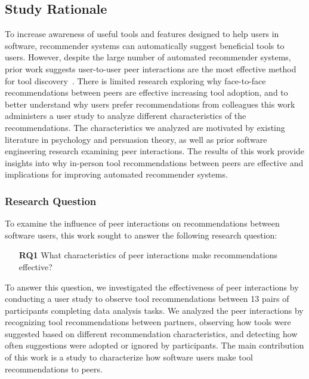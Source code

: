 \subsection{Study Rationale}

To increase awareness of useful tools and features designed to help users in software, recommender systems can automatically suggest beneficial tools to users. However, despite the large number of automated recommender systems, prior work suggests user-to-user peer interactions are the most effective method for tool discovery~\cite{Murphy-Hill2011PeerInteraction}. There is limited research exploring why face-to-face recommendations between peers are effective increasing tool adoption, and to better understand why users prefer recommendations from colleagues this work administers a user study to analyze different characteristics of the recommendations. The characteristics we analyzed are motivated by existing literature in psychology and persuasion theory, as well as prior software engineering research examining peer interactions. The results of this work provide insights into why in-person tool recommendations between peers are effective and implications for improving automated recommender systems.

\subsubsection{Research Question}

To examine the influence of peer interactions on recommendations between software users, this work sought to answer the following research question:

\begin{itemize}
    \item[\textbf{RQ1}] What characteristics of peer interactions make recommendations effective?
\end{itemize}

To answer this question, we investigated the effectiveness of peer interactions by conducting a user study to observe tool recommendations between 13 pairs of participants completing data analysis tasks. We analyzed the peer interactions by recognizing tool recommendations between partners, observing how tools were suggested based on different recommendation characteristics, and detecting how often suggestions were adopted or ignored by participants. The main contribution of this work is a study to characterize how software users make tool recommendations to peers.


